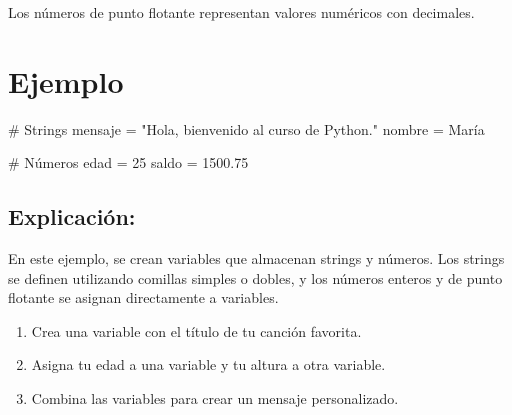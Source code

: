 \documentclass[
  a4paper,
  DIV=11,
  numbers=noendperiod,
  onepage,
  openany]{scrreprt}
\newenvironment{Shaded}{\begin{snugshade}}{\end{snugshade}}
\newcommand{\CommentTok}[1]{\textcolor[rgb]{0.37,0.37,0.37}{#1}}
\newcommand{\DecValTok}[1]{\textcolor[rgb]{0.68,0.00,0.00}{#1}}
\newcommand{\FloatTok}[1]{\textcolor[rgb]{0.68,0.00,0.00}{#1}}
\newcommand{\NormalTok}[1]{\textcolor[rgb]{0.00,0.23,0.31}{#1}}
\newcommand{\OperatorTok}[1]{\textcolor[rgb]{0.37,0.37,0.37}{#1}}
\newcommand{\StringTok}[1]{\textcolor[rgb]{0.13,0.47,0.30}{#1}}
\providecommand{\tightlist}{%
  \setlength{\itemsep}{0pt}\setlength{\parskip}{0pt}}\usepackage{longtable,booktabs,array}
\begin{document}
Los números de punto flotante representan valores numéricos con
decimales.

\section{Ejemplo}\label{ejemplo-3}

\begin{Shaded}
\begin{Highlighting}[]
\CommentTok{\# Strings}
\NormalTok{mensaje }\OperatorTok{=} \StringTok{"Hola, bienvenido al curso de Python."}
\NormalTok{nombre }\OperatorTok{=} \StringTok{\textquotesingle{}María\textquotesingle{}}

\CommentTok{\# Números}
\NormalTok{edad }\OperatorTok{=} \DecValTok{25}
\NormalTok{saldo }\OperatorTok{=} \FloatTok{1500.75}
\end{Highlighting}
\end{Shaded}

\subsection{Explicación:}\label{explicaciuxf3n-5}

En este ejemplo, se crean variables que almacenan strings y números. Los
strings se definen utilizando comillas simples o dobles, y los números
enteros y de punto flotante se asignan directamente a variables.

\begin{tcolorbox}[enhanced jigsaw, toptitle=1mm, toprule=.15mm, title=\textcolor{quarto-callout-tip-color}{\faLightbulb}\hspace{0.5em}{Actividad Práctica}, colbacktitle=quarto-callout-tip-color!10!white, opacitybacktitle=0.6, titlerule=0mm, colback=white, left=2mm, bottomrule=.15mm, breakable, bottomtitle=1mm, rightrule=.15mm, colframe=quarto-callout-tip-color-frame, arc=.35mm, leftrule=.75mm, coltitle=black, opacityback=0]

\begin{enumerate}
\def\labelenumi{\arabic{enumi}.}
\tightlist
\item
  Crea una variable con el título de tu canción favorita.
\item
  Asigna tu edad a una variable y tu altura a otra variable.
\item
  Combina las variables para crear un mensaje personalizado.
\end{enumerate}

\end{tcolorbox}
\end{document}
